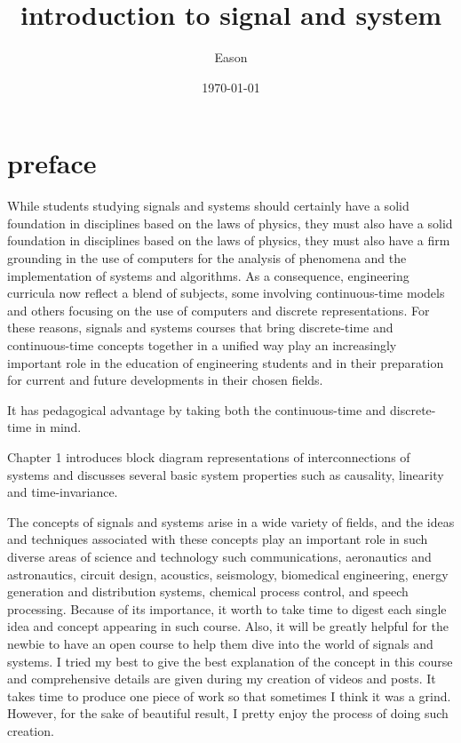 \documentclass[koma,utopia,letterpaper,captions=tableheading,11pt,listings-sv,microtype,paralist,colorlinks=true,urlcolor=blue]{org-article}
\author{Eason}
\date{\today}
\title{introduction to signal and system}
\begin{document}
\maketitle
\tableofcontents

\section{preface}
\label{sec:orgb73e917}


While students studying signals and systems should certainly have a solid
foundation in disciplines based on the laws of physics, they must also have a
solid foundation in disciplines based on the laws of physics, they must also
have a firm grounding in the use of computers for the analysis of phenomena
and the implementation of systems and algorithms. As a consequence, engineering
curricula now reflect a blend of subjects, some involving continuous-time models
and others focusing on the use of computers and discrete representations. For
these reasons, signals and systems courses that bring discrete-time and
continuous-time concepts together in a unified way play an increasingly
important role in the education of engineering students and in their preparation
for current and future developments in their chosen fields.

It has pedagogical advantage by taking both the continuous-time and
discrete-time in mind.

Chapter 1 introduces block diagram representations of interconnections of
systems and discusses several basic system properties such as causality,
linearity and time-invariance.

The concepts of signals and systems arise in a wide variety of fields, and the
ideas and techniques associated with these concepts play an important role in
such diverse areas of science and technology such communications, aeronautics
and astronautics, circuit design, acoustics, seismology, biomedical engineering,
energy generation and distribution systems, chemical process control, and speech
processing. Because of its importance, it worth to take time to digest each
single idea and concept appearing in such course. Also, it will be greatly
helpful for the newbie to have an open course to help them dive into the world
of signals and systems. I tried my best to give the best explanation of the
concept in this course and comprehensive details are given during my creation of
videos and posts. It takes time to produce one piece of work so that sometimes I
think it was a grind. However, for the sake of beautiful result, I pretty enjoy
the process of doing such creation.
\end{document}
